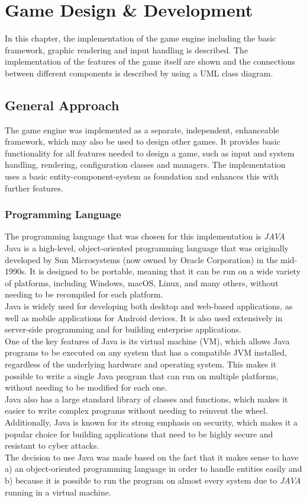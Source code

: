 \section{Game Design \& Development}\label{sec:implementation}
In this chapter, the implementation of the game engine including the basic framework, graphic rendering and input handling is described.
The implementation of the features of the game itself are shown and the connections between different components is described by using a
UML class diagram.

\subsection{General Approach}\label{subsec:general-approach}
The game engine was implemented as a separate, independent, enhanceable framework, which may also be used to design other
games.
It provides basic functionality for all features needed to design a game, such as input and system handling, rendering, configuration
classes and managers.
The implementation uses a basic entity-component-system as foundation and enhances this with further features.

\subsubsection{Programming Language}\label{subsubsec:programming-language}
The programming language that was chosen for this implementation is \textit{JAVA} \\

Java is a high-level, object-oriented programming language that was originally developed by Sun Microsystems (now owned by Oracle Corporation) in the mid-1990s.
It is designed to be portable, meaning that it can be run on a wide variety of platforms, including Windows, macOS, Linux, and many others, without needing to be recompiled for each platform.
\\
Java is widely used for developing both desktop and web-based applications, as well as mobile applications for Android devices.
It is also used extensively in server-side programming and for building enterprise applications.
\\
One of the key features of Java is its virtual machine (VM), which allows Java programs to be executed on any system that has a compatible JVM installed, regardless of the underlying hardware and operating system.
This makes it possible to write a single Java program that can run on multiple platforms, without needing to be modified for each one.
\\
Java also has a large standard library of classes and functions, which makes it easier to write complex programs without needing to reinvent the wheel.
Additionally, Java is known for its strong emphasis on security, which makes it a popular choice for building applications that need to be highly secure and resistant to cyber attacks.
\\
The decision to use Java was made based on the fact that it makes sense to have a) an object-oriented programming language in order to
handle entities easily and b) because it is possible to run the program on almost every system due to \textit{JAVA} running
in a virtual machine.

